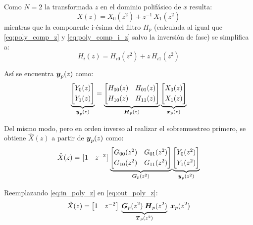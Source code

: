 	Como $N=2$ la transformada $z$ en el dominio polifásico de $x$ resulta:
		\begin{equation}
			X(z) = X_0 (z^2) + z^{-1}\, X_1 (z^2)
			\label{eq:xp_z}
		\end{equation}
	mientras que la componente i-ésima del filtro $H_p$ (calculada al igual que \eqref{eq:poly_comp_z} y \eqref{eq:poly_comp_i_z} salvo la inversión de fase) se simplifica a:
		\begin{equation}
			H_i(z) = H_{i0} (z^2) + z\, H_{i1} (z^2)
			\label{eq:hpi_z}
		\end{equation}

		Así se encuentra $\boldsymbol{y}_p(z)$ como:
		\begin{equation}
		\underbrace{\begin{bmatrix} Y_0(z)\\[0.3em] Y_1(z) \end{bmatrix}}_{\boldsymbol{y}_p(z)} = \underbrace{\begin{bmatrix} H_{00}(z) & H_{01}(z) \\[0.3em] H_{10}(z) & H_{11}(z) \end{bmatrix}}_{\boldsymbol{H}_p(z)} \underbrace{\begin{bmatrix} X_0(z) \\[0.3em] X_1(z) \end{bmatrix}}_{\boldsymbol{x}_p(z)}
			\label{eq:in_poly_z}
		\end{equation}

		Del mismo modo, pero en orden inverso al realizar el sobremuestreo primero, se obtiene $\hat{X}(z)$ a partir de $\boldsymbol{y}_p(z)$ como:
		\begin{equation}
		\hat{X}(z) = \begin{bmatrix} 1 & z^{-2} \end{bmatrix} \underbrace{\begin{bmatrix} G_{00}(z^2) & G_{01}(z^2) \\[0.3em] G_{10}(z^2) & G_{11}(z^2) \end{bmatrix}}_{\boldsymbol{G}_p(z^2)} \underbrace{\begin{bmatrix} Y_0(z^2)\\[0.3em] Y_1(z^2) \end{bmatrix}}_{\boldsymbol{y}_p(z^2)} 
			\label{eq:out_poly_z}
		\end{equation}

		Reemplazando \eqref{eq:in_poly_z} en \eqref{eq:out_poly_z}:
		\begin{equation*}
		\hat{X}(z) = \begin{bmatrix} 1 & z^{-2} \end{bmatrix}\; \underbrace{\boldsymbol{G}_p(z^2) \; \boldsymbol{H}_p(z^2)}_{\boldsymbol{T}_p(z^2)} \; \boldsymbol{x}_p(z^2)
		\end{equation*}

